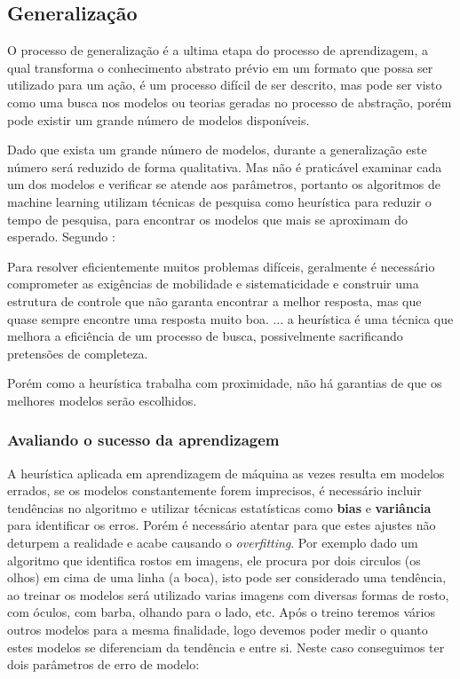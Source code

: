 \subsection{Generalização}
\label{subsec:generalização-dados}

O processo de generalização é a ultima etapa do processo de aprendizagem, a qual transforma o conhecimento abstrato prévio em um formato que 
possa ser utilizado para um ação, é um processo difícil de ser descrito, mas pode ser visto como uma busca nos modelos 
ou teorias geradas no processo de abstração, porém pode existir um grande número de modelos disponíveis.

Dado que exista um grande número de modelos, durante a generalização este número será reduzido de forma qualitativa. 
Mas não é praticável examinar cada um dos modelos e verificar se atende aos parâmetros, portanto os algoritmos de machine learning utilizam 
técnicas de pesquisa como heurística para reduzir o tempo de pesquisa, para encontrar os modelos que mais se aproximam do esperado.
Segundo \cite{heuristica}:
\begin{citacao}
Para resolver eficientemente muitos problemas difíceis, geralmente é
necessário comprometer as exigências de mobilidade e sistematicidade e
construir uma estrutura de controle que não garanta encontrar a melhor
resposta, mas que quase sempre encontre uma resposta muito boa. ... a
heurística é uma técnica que melhora a eficiência de um processo de
busca, possivelmente sacrificando pretensões de completeza. 
\end{citacao} 


Porém como a heurística trabalha com proximidade, não há garantias de que os melhores modelos serão escolhidos.

\subsubsection{Avaliando o sucesso da aprendizagem}
\label{subsec:avaliando-generalização-dados}

A heurística aplicada em aprendizagem de máquina as vezes resulta em modelos errados, se os modelos constantemente 
forem imprecisos, é necessário incluir tendências no algoritmo e utilizar técnicas estatísticas como \textbf{bias} e \textbf{variância} 
para identificar os erros. Porém é necessário atentar para que estes ajustes não deturpem a realidade e acabe causando o \textit{overfitting}.
Por exemplo dado um algoritmo que identifica rostos em imagens, ele procura por dois circulos (os olhos) em cima de uma linha (a boca), isto pode 
ser considerado uma tendência, ao treinar os modelos será utilizado varias imagens com diversas formas de rosto, com óculos, 
com barba, olhando para o lado, etc.
Após o treino teremos vários outros modelos para a mesma finalidade, logo devemos poder medir o quanto estes modelos 
se diferenciam da tendência e entre si. Neste caso conseguimos ter dois parâmetros de erro de modelo:

